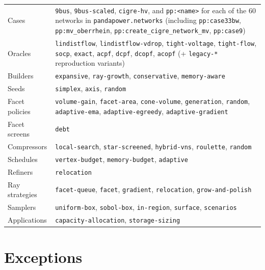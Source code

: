 \documentclass[11pt,a4paper]{report}
\newcommand{\code}[1]{\texttt{\small #1}}
\begin{document}
\begin{center}\small
\begin{tabular}{@{}>{\raggedright\arraybackslash}p{2.6cm}>{\raggedright\arraybackslash}p{11.9cm}@{}}
\toprule
Cases & \code{9bus}, \code{9bus-scaled}, \code{cigre-hv},
  and \code{pp:<name>} for each of the 60 networks in
  \code{pandapower.networks} (including \code{pp:case33bw},
  \code{pp:mv\_oberrhein}, \code{pp:create\_cigre\_network\_mv},
  \code{pp:case9}) \\
Oracles & \code{lindistflow}, \code{lindistflow-vdrop}, \code{tight-voltage},
  \code{tight-flow}, \code{socp}, \code{exact}, \code{acpf}, \code{dcpf},
  \code{dcopf}, \code{acopf} (+ \code{legacy-*} reproduction variants) \\
Builders & \code{expansive}, \code{ray-growth}, \code{conservative}, \code{memory-aware} \\
Seeds & \code{simplex}, \code{axis}, \code{random} \\
Facet policies & \code{volume-gain}, \code{facet-area}, \code{cone-volume},
  \code{generation}, \code{random}, \code{adaptive-ema},
  \code{adaptive-egreedy}, \code{adaptive-gradient} \\
Facet screens & \code{debt} \\
Compressors & \code{local-search}, \code{star-screened}, \code{hybrid-vns},
  \code{roulette}, \code{random} \\
Schedules & \code{vertex-budget}, \code{memory-budget}, \code{adaptive} \\
Refiners & \code{relocation} \\
Ray strategies & \code{facet-queue}, \code{facet}, \code{gradient}, \code{relocation},
  \code{grow-and-polish} \\
Samplers & \code{uniform-box}, \code{sobol-box}, \code{in-region},
  \code{surface}, \code{scenarios} \\
Applications & \code{capacity-allocation}, \code{storage-sizing} \\
\bottomrule
\end{tabular}
\end{center}

\section{Exceptions}
\end{document}
